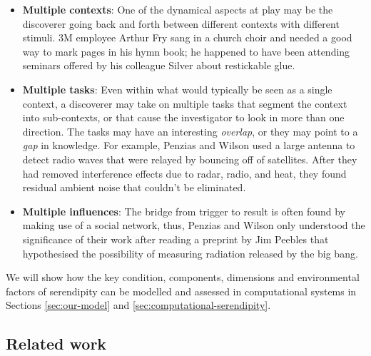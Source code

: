 \begin{itemize}
\item \textbf{Multiple contexts}: One of the dynamical aspects at play
  may be the discoverer going back and forth between different
  contexts with different stimuli.  3M employee Arthur Fry sang in a
  church choir and needed a good way to mark pages in his hymn book;
  he happened to have been attending seminars offered by his colleague
  Silver about restickable glue.
\end{itemize}

\begin{itemize}
\item \textbf{Multiple tasks}: Even within what would typically be
  seen as a single context, a discoverer may take on multiple tasks
  that segment the context into sub-contexts, or that cause the
  investigator to look in more than one direction.  The tasks may have
  an interesting \emph{overlap}, or they may point to a \emph{gap} in
  knowledge.  For example, Penzias and Wilson used a
  large antenna to detect radio waves that were relayed by bouncing
  off of satellites.  After they had removed interference effects due
  to radar, radio, and heat, they found residual ambient noise that
  couldn't be eliminated.
\end{itemize}

\begin{itemize}
\item \textbf{Multiple influences}: The bridge from trigger to
  result is often found by making use of a social network, thus, 
  Penzias and Wilson only understood the significance of their work
  after reading a preprint by Jim Peebles that hypothesised the
  possibility of measuring radiation released by the big bang.
\end{itemize}

\noindent We will show how the key condition, components,
dimensions and environmental factors of serendipity can be modelled
and assessed in computational systems in Sections \ref{sec:our-model}
and \ref{sec:computational-serendipity}.

% 

\subsection{Related work} \label{sec:related}

